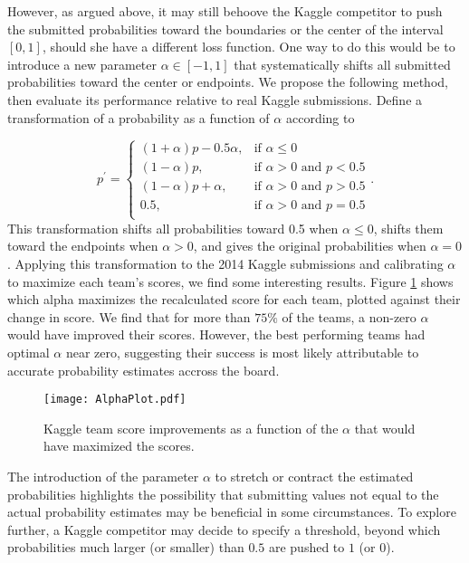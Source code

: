 However, as argued above, it may still behoove the Kaggle competitor to push the submitted probabilities toward the boundaries or the center of the interval $[0,1]$, should she have a different loss function. One way to do this would be to introduce a new parameter $\alpha \in [-1,1]$ that systematically shifts all submitted probabilities toward the center or endpoints. We propose the following method, then evaluate its performance relative to real Kaggle submissions. Define a transformation of a probability as a function of $\alpha$ according to

$$
p^\prime= \left\{ \begin{array}{lr} 
			(1+\alpha)p - 0.5\alpha, & \mbox{if $\alpha \le 0$} \\
			(1-\alpha)p, & \mbox{if $\alpha >0$ and $p < 0.5$} \\
			(1-\alpha)p + \alpha, & \mbox{if $\alpha >0$ and $p > 0.5$} \\
			0.5,  & \mbox{if $\alpha >0$ and $p = 0.5$} \\
		   \end{array} \right. . 
$$
This transformation shifts all probabilities toward 0.5 when $\alpha \le 0$, shifts them toward the endpoints when $\alpha>0$, and gives the original probabilities when $\alpha=0$.  
Applying this transformation to the 2014 Kaggle submissions and calibrating $\alpha$ to maximize each team's scores, we find some interesting results. Figure \ref{fig:alphas} shows which alpha maximizes the recalculated score for each team, plotted against their change in score. We find that for more than $75\%$ of the teams, a non-zero $\alpha$ would have improved their scores. However, the best performing teams had optimal $\alpha$ near zero, suggesting their success is most likely attributable to accurate probability estimates accross the board.

\begin{figure}
	\centering
	\texttt{[image: AlphaPlot.pdf]}
	\caption{Kaggle team score improvements as a function of the $\alpha$ that would have maximized the scores.}
	\label{fig:alphas}
\end{figure}

The introduction of the parameter $\alpha$ to stretch or contract the estimated probabilities highlights the possibility that submitting values not equal to the actual probability estimates may be beneficial in some circumstances. To explore further, a Kaggle competitor may decide to specify a threshold, beyond which probabilities much larger (or smaller) than $0.5$ are pushed to $1$ (or $0$).

